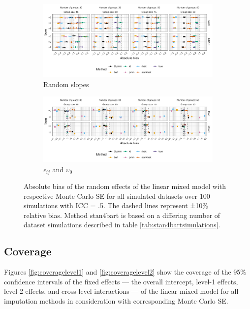 \documentclass[3p,12pt,a4paper]{elsarticle}
\begin{document}
\begin{figure}[H]
    \centering 
    \begin{subfigure}[b]{1\textwidth}
        \centering
        \includegraphics[width=1\textwidth]{biasrandom.png}
        \caption{Random slopes}
        \label{fig:biasrandom}
    \end{subfigure}
    \begin{subfigure}[b]{1\textwidth}
        \centering
        \includegraphics[width=1\textwidth]{bias2.png}
        \caption{$\epsilon_{ij}$ and $\upsilon_0$}
        \label{fig:bias2}
    \end{subfigure}
    \caption{Absolute bias of the random effects of the linear mixed model with respective Monte Carlo SE for all simulated datasets over 100 simulations with ICC = .5. The dashed lines represent ±10\% relative bias. Method stan4bart is based on a differing number of dataset simulations described in table \ref{tab:stan4bartsimulations}.}
    \label{fig:biasrandom2}
\end{figure}

\subsection{Coverage}
Figures \ref{fig:coveragelevel1} and \ref{fig:coveragelevel2} show the coverage of the 95\% confidence intervals of the fixed effects --- the overall intercept, level-1 effects, level-2 effects, and cross-level interactions --- of the linear mixed model for all imputation methods in consideration with corresponding Monte Carlo SE.
\end{document}
